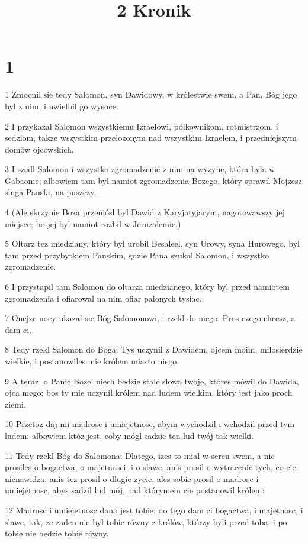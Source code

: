 

\title{2 Kronik}


\chapter{1}

\par 1 Zmocnil sie tedy Salomon, syn Dawidowy, w królestwie swem, a Pan, Bóg jego byl z nim, i uwielbil go wysoce.
\par 2 I przykazal Salomon wszystkiemu Izraelowi, pólkownikom, rotmistrzom, i sedziom, takze wszystkim przelozonym nad wszystkim Izraelem, i przedniejszym domów ojcowskich.
\par 3 I szedl Salomon i wszystko zgromadzenie z nim na wyzyne, która byla w Gabaonie; albowiem tam byl namiot zgromadzenia Bozego, który sprawil Mojzesz sluga Panski, na puszczy.
\par 4 (Ale skrzynie Boza przeniósl byl Dawid z Karyjatyjarym, nagotowawszy jej miejsce; bo jej byl namiot rozbil w Jeruzalemie.)
\par 5 Oltarz tez miedziany, który byl urobil Besaleel, syn Urowy, syna Hurowego, byl tam przed przybytkiem Panskim, gdzie Pana szukal Salomon, i wszystko zgromadzenie.
\par 6 I przystapil tam Salomon do oltarza miedzianego, który byl przed namiotem zgromadzenia i ofiarowal na nim ofiar palonych tysiac.
\par 7 Onejze nocy ukazal sie Bóg Salomonowi, i rzekl do niego: Pros czego chcesz, a dam ci.
\par 8 Tedy rzekl Salomon do Boga: Tys uczynil z Dawidem, ojcem moim, milosierdzie wielkie, i postanowiles mie królem miasto niego.
\par 9 A teraz, o Panie Boze! niech bedzie stale slowo twoje, któres mówil do Dawida, ojca mego; bos ty mie uczynil królem nad ludem wielkim, który jest jako proch ziemi.
\par 10 Przetoz daj mi madrosc i umiejetnosc, abym wychodzil i wchodzil przed tym ludem: albowiem któz jest, coby mógl sadzic ten lud twój tak wielki.
\par 11 Tedy rzekl Bóg do Salomona: Dlatego, izes to mial w sercu swem, a nie prosiles o bogactwa, o majetnosci, i o slawe, anis prosil o wytracenie tych, co cie nienawidza, anis tez prosil o dlugie zycie, ales sobie prosil o madrosc i umiejetnosc, abys sadzil lud mój, nad którymem cie postanowil królem:
\par 12 Madrosc i umiejetnosc dana jest tobie; do tego dam ci bogactwa, i majetnosc, i slawe, tak, ze zaden nie byl tobie równy z królów, którzy byli przed toba, i po tobie nie bedzie tobie równy.
